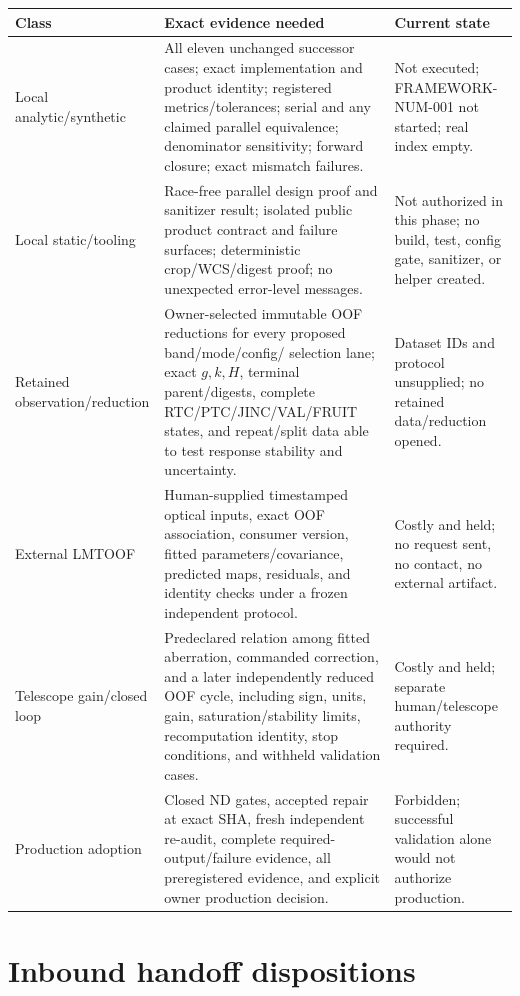 \documentclass[10pt]{article}
\begin{document}
\begin{longtable}{@{}L{0.18\textwidth}L{0.48\textwidth}L{0.25\textwidth}@{}}
\toprule
Class & Exact evidence needed & Current state \\
\midrule
\endhead
Local analytic/synthetic &
All eleven unchanged successor cases; exact implementation and product
identity; registered metrics/tolerances; serial and any claimed parallel
equivalence; denominator sensitivity; forward closure; exact mismatch
failures. &
Not executed; FRAMEWORK-NUM-001 not started; real index empty. \\
Local static/tooling &
Race-free parallel design proof and sanitizer result; isolated public product
contract and failure surfaces; deterministic crop/WCS/digest proof; no
unexpected error-level messages. &
Not authorized in this phase; no build, test, config gate, sanitizer, or
helper created. \\
Retained observation/reduction &
Owner-selected immutable OOF reductions for every proposed band/mode/config/
selection lane; exact $g,k,H$, terminal parent/digests, complete
RTC/PTC/JINC/VAL/FRUIT states, and repeat/split data able to test response
stability and uncertainty. &
Dataset IDs and protocol unsupplied; no retained data/reduction opened. \\
External LMTOOF &
Human-supplied timestamped optical inputs, exact OOF association, consumer
version, fitted parameters/covariance, predicted maps, residuals, and identity
checks under a frozen independent protocol. &
Costly and held; no request sent, no contact, no external artifact. \\
Telescope gain/closed loop &
Predeclared relation among fitted aberration, commanded correction, and a
later independently reduced OOF cycle, including sign, units, gain,
saturation/stability limits, recomputation identity, stop conditions, and
withheld validation cases. &
Costly and held; separate human/telescope authority required. \\
Production adoption &
Closed ND gates, accepted repair at exact SHA, fresh independent re-audit,
complete required-output/failure evidence, all preregistered evidence, and
explicit owner production decision. &
Forbidden; successful validation alone would not authorize production. \\
\bottomrule
\end{longtable}

\section{Inbound handoff dispositions}
\end{document}
